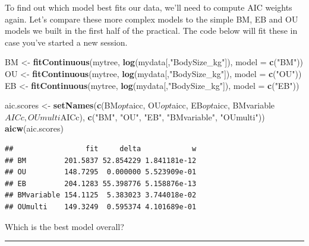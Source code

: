 \documentclass[]{book}
\newenvironment{Shaded}{\begin{snugshade}}{\end{snugshade}}
\newcommand{\KeywordTok}[1]{\textcolor[rgb]{0.13,0.29,0.53}{\textbf{{#1}}}}
\newcommand{\DataTypeTok}[1]{\textcolor[rgb]{0.13,0.29,0.53}{{#1}}}
\newcommand{\StringTok}[1]{\textcolor[rgb]{0.31,0.60,0.02}{{#1}}}
\newcommand{\NormalTok}[1]{{#1}}
\begin{document}
To find out which model best fits our data, we'll need to compute AIC
weights again. Let's compare these more complex models to the simple BM,
EB and OU models we built in the first half of the practical. The code
below will fit these in case you've started a new session.

\begin{Shaded}
\begin{Highlighting}[]
\NormalTok{BM <-}\StringTok{ }\KeywordTok{fitContinuous}\NormalTok{(mytree, }\KeywordTok{log}\NormalTok{(mydata[,}\StringTok{"BodySize_kg"}\NormalTok{]), }\DataTypeTok{model =} \KeywordTok{c}\NormalTok{(}\StringTok{"BM"}\NormalTok{))}
\NormalTok{OU <-}\StringTok{ }\KeywordTok{fitContinuous}\NormalTok{(mytree, }\KeywordTok{log}\NormalTok{(mydata[,}\StringTok{"BodySize_kg"}\NormalTok{]), }\DataTypeTok{model =} \KeywordTok{c}\NormalTok{(}\StringTok{"OU"}\NormalTok{))}
\NormalTok{EB <-}\StringTok{ }\KeywordTok{fitContinuous}\NormalTok{(mytree, }\KeywordTok{log}\NormalTok{(mydata[,}\StringTok{"BodySize_kg"}\NormalTok{]), }\DataTypeTok{model =} \KeywordTok{c}\NormalTok{(}\StringTok{"EB"}\NormalTok{))}
\end{Highlighting}
\end{Shaded}

\begin{Shaded}
\begin{Highlighting}[]
\NormalTok{aic.scores <-}\StringTok{ }\KeywordTok{setNames}\NormalTok{(}\KeywordTok{c}\NormalTok{(BM$opt$aicc, OU$opt$aicc, EB$opt$aicc, BMvariable$AICc, OUmulti$AICc), }
                       \KeywordTok{c}\NormalTok{(}\StringTok{"BM"}\NormalTok{, }\StringTok{"OU"}\NormalTok{, }\StringTok{"EB"}\NormalTok{, }\StringTok{"BMvariable"}\NormalTok{, }\StringTok{"OUmulti"}\NormalTok{))}
\KeywordTok{aicw}\NormalTok{(aic.scores)}
\end{Highlighting}
\end{Shaded}

\begin{verbatim}
##                 fit     delta            w
## BM         201.5837 52.854229 1.841181e-12
## OU         148.7295  0.000000 5.523909e-01
## EB         204.1283 55.398776 5.158876e-13
## BMvariable 154.1125  5.383023 3.744018e-02
## OUmulti    149.3249  0.595374 4.101689e-01
\end{verbatim}

Which is the best model overall?

\begin{center}\rule{0.5\linewidth}{\linethickness}\end{center}
\end{document}

